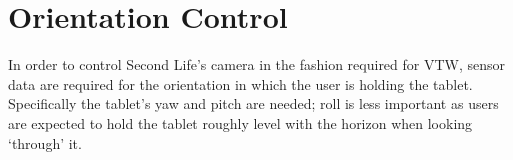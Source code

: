 

\section{Orientation Control}

\label{OrientationControl}

\newcommand{\ArduinoFootnote}{\footnote{\url{http://www.arduino.cc/}}}

\newcommand{\MMAfootnote}{\footnote{\url{http://cache.freescale.com/files/sensors/doc/data_sheet/MMA8452Q.pdf}}}

\newcommand{\ADXLfootnote}{\footnote{\url{http://www.analog.com/static/imported-files/data_sheets/ADXL335.pdf}}}

\newcommand{\HMCfootnote}{\footnote{\url{http://www51.honeywell.com/aero/common/documents/myaerospacecatalog-documents/Defense_Brochures-documents/HMC5883L_3-Axis_Digital_Compass_IC.pdf}}}

\newcommand{\HMCtwoFootnote}{\footnote{\url{http://www51.honeywell.com/aero/common/documents/myaerospacecatalog-documents/Missiles-Munitions/HMC6343.pdf}}}

\newcommand{\HMCvccFootnote}{\footnote{The HMC6343 requires 2.7 to 3.6V input on VCC/VDD, this table showing connection to 5V assumes a HMC6343 breakout with appropriate step down.}}

\newcommand{\itwocFootnote}{\footnote{The HMC6343's I2C lines must be pulled up to 3.3V, this table shows connection to an Arduino Uno R3's I2C lines which are pulled up to 5V assuming a HMC6343 breakout with appropriate level shifters.}}



In order to control Second Life's camera in the fashion required for VTW, sensor data are required for the orientation in which the user is holding the tablet. Specifically the tablet's yaw and pitch are needed; roll is less important as users are expected to hold the tablet roughly level with the horizon when looking `through' it.


